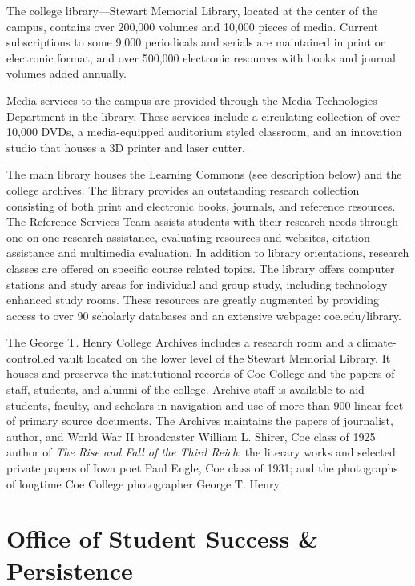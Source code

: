 \documentclass[
  letterpaper,
]{scrbook}
\begin{document}
The college library---Stewart Memorial Library, located at the center of
the campus, contains over 200,000 volumes and 10,000 pieces of media.
Current subscriptions to some 9,000 periodicals and serials are
maintained in print or electronic format, and over 500,000 electronic
resources with books and journal volumes added annually.

Media services to the campus are provided through the Media Technologies
Department in the library. These services include a circulating
collection of over 10,000 DVDs, a media-equipped auditorium styled
classroom, and an innovation studio that houses a 3D printer and laser
cutter.

The main library houses the Learning Commons (see description below) and
the college archives. The library provides an outstanding research
collection consisting of both print and electronic books, journals, and
reference resources. The Reference Services Team assists students with
their research needs through one-on-one research assistance, evaluating
resources and websites, citation assistance and multimedia evaluation.
In addition to library orientations, research classes are offered on
specific course related topics. The library offers computer stations and
study areas for individual and group study, including technology
enhanced study rooms. These resources are greatly augmented by providing
access to over 90 scholarly databases and an extensive webpage:
coe.edu/library.

The George T. Henry College Archives includes a research room and a
climate-controlled vault located on the lower level of the Stewart
Memorial Library. It houses and preserves the institutional records of
Coe College and the papers of staff, students, and alumni of the
college. Archive staff is available to aid students, faculty, and
scholars in navigation and use of more than 900 linear feet of primary
source documents. The Archives maintains the papers of journalist,
author, and World War II broadcaster William L. Shirer, Coe class of
1925 author of \emph{The Rise and Fall of the Third Reich}; the literary
works and selected private papers of Iowa poet Paul Engle, Coe class of
1931; and the photographs of longtime Coe College photographer George T.
Henry.

\section{Office of Student Success \&
Persistence}\label{office-of-student-success-persistence}
\end{document}
